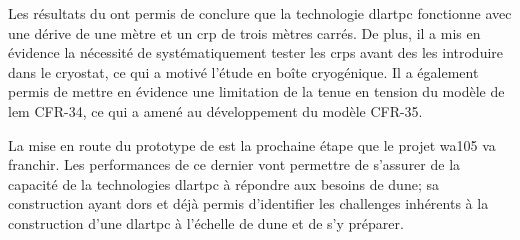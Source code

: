 Les résultats du \TOO{} ont permis de conclure que la technologie \gls{dlartpc} fonctionne avec une dérive de une mètre et un \gls{crp} de trois mètres carrés. De plus, il a mis en évidence la nécessité de systématiquement tester les \glspl{crp} avant des les introduire dans le cryostat, ce qui a motivé l'étude en boîte cryogénique. Il a également permis de mettre en évidence une limitation de la tenue en tension du modèle de \gls{lem} CFR-34, ce qui a amené au développement du modèle CFR-35.

La mise en route du prototype de \SSS{} est la prochaine étape que le projet \gls{wa105} va franchir. Les performances de ce dernier vont permettre de s'assurer de la capacité de la technologies \gls{dlartpc} à répondre aux besoins de \gls{dune}; sa construction ayant dors et déjà permis d'identifier les challenges inhérents à la construction d'une \gls{dlartpc} à l'échelle de \gls{dune} et de s'y préparer.